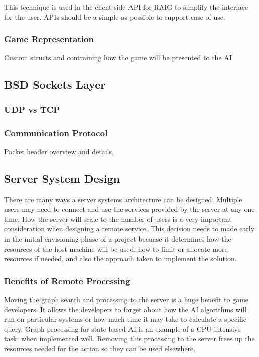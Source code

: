 \documentclass[12pt,a4paper,titlepage]{article}
\begin{document}
This technique is used in the client side API for RAIG to simplify the interface for the user. APIs should be a simple as possible to support ease of use. 

\subsubsection{Game Representation}

Custom structs and contraining how the game will be presented to the AI


\subsection{BSD Sockets Layer}

\subsubsection{UDP vs TCP}

\subsubsection{Communication Protocol}

Packet header overview and details.\\

\subsection{Server System Design}

There are many ways a server systems architecture can be designed. Multiple users may need to connect and use the services provided by the server at any one time. How the server will scale to the number of users is a very important consideration when designing a remote service. This decision needs to made early in the initial envisioning phase of a project becuase it determines how the resources of the host machine will be used, how to limit or allocate more resources if needed, and also the approach taken to implement the solution.\\

\subsubsection{Benefits of Remote Processing}

Moving the graph search and processing to the server is a huge benefit to game developers. It allows the developers to forget about how the AI algorithms will run on particular systems or how much time it may take to calculate a specific query. Graph processing for state based AI is an example of a CPU intensive task, when implemented well. Removing this processing to the server frees up the resources needed for the action so they can be used elsewhere.\\
\end{document}

